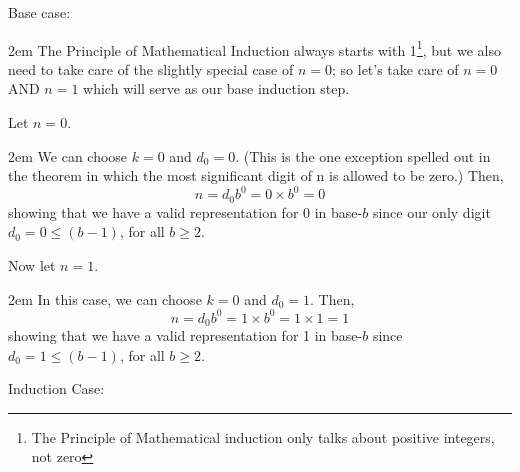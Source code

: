 \documentclass{article}
\newenvironment{jprIn}{\begin{adjustwidth}{2em}{}}{\end{adjustwidth}}
\begin{document}
Base case:
\begin{jprIn}
The Principle of Mathematical Induction always starts with 1\footnote{The Principle of Mathematical induction only talks about positive integers, not zero}, but we also need to take
care of the slightly special case of $n=0$; so let's take care of $n=0$ AND $n=1$ which will serve as our base induction step.

Let $n=0$.

\begin{jprIn}
We can choose $k=0$ and $d_0=0$.
(This is the one exception spelled out in the theorem in
which the most significant digit of n is allowed to be zero.) Then,
\[n=d_0b^0=0\times{}b^0=0\]
showing that we have a valid representation for 0 in base-$b$ since our only digit\\
$d_0=0\le(b-1)$, for all $b\ge2$.
\end{jprIn}

Now let $n=1$.

\begin{jprIn}
In this case, we can choose $k=0$ and $d_0=1$.  Then,
\[n=d_0b^0=1\times{}b^0=1\times{}1=1\]
showing that we have a valid representation for 1 in base-$b$ since\\
$d_0=1\le(b-1)$, for all $b\ge2$.
\end{jprIn}
\end{jprIn}
\bigskip

Induction Case:
\end{document}
